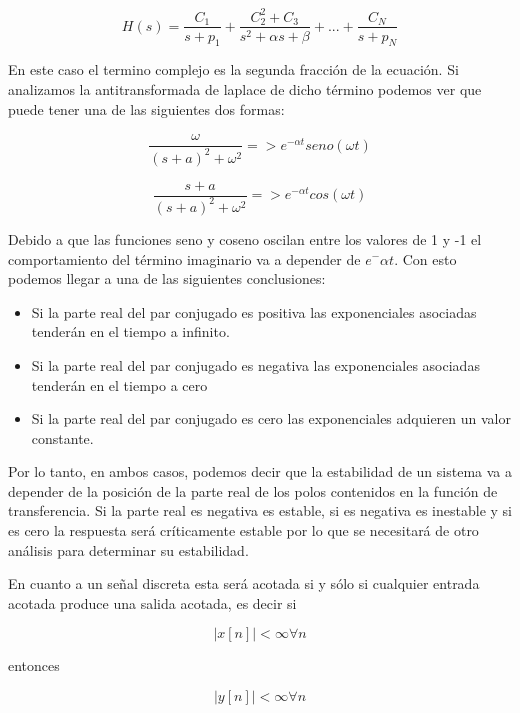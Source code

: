 \begin{equation}
H(s)=\frac{C_1}{s+p_1}+\frac{C_2^2+C_3}{s^2+\alpha s+\beta}+...+\frac{C_N}{s+p_N}
\end{equation}

En este caso el termino complejo es la segunda fracción de la ecuación. Si analizamos la antitransformada de laplace de dicho término podemos ver que puede tener una de las siguientes dos formas:

\begin{equation}
\frac{\omega}{(s+a)^2+{\omega}^2} => e^{-\alpha t}seno(\omega t)
\end{equation}

\begin{equation}
\frac{s+a}{(s+a)^2+{\omega}^2} => e^{-\alpha t}cos(\omega t)
\end{equation}

Debido a que las funciones seno y coseno oscilan entre los valores de 1 y -1 el comportamiento del término imaginario va a depender de $e^-{\alpha t}$. Con esto podemos llegar a una de las siguientes conclusiones:

\begin{itemize}
\item Si la parte real del par conjugado es positiva las exponenciales asociadas tenderán en el tiempo a infinito.
\item Si la parte real del par conjugado es negativa las exponenciales asociadas tenderán en el tiempo a cero
\item Si la parte real del par conjugado es cero las exponenciales adquieren un valor constante.
\end{itemize}

Por lo tanto, en ambos casos, podemos decir que la estabilidad de un sistema va a depender de la posición de la parte real de los polos contenidos en la función de transferencia. Si la parte real es negativa es estable, si es negativa es inestable y si es cero la respuesta será críticamente estable por lo que se necesitará de otro análisis para determinar su estabilidad.

En cuanto a un señal discreta esta será acotada si y sólo si cualquier entrada acotada produce una salida acotada, es decir si

\begin{equation}
|x[n]|<\infty \forall n
\end{equation}

entonces 

\begin{equation}
|y[n]|<\infty \forall n
\end{equation}

